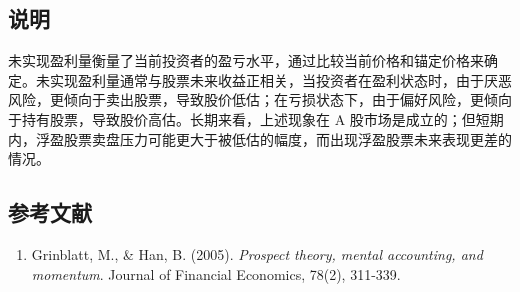 \documentclass{article}
\begin{document}
\subsection{说明}
未实现盈利量衡量了当前投资者的盈亏水平，通过比较当前价格和锚定价格来确定。未实现盈利量通常与股票未来收益正相关，当投资者在盈利状态时，由于厌恶风险，更倾向于卖出股票，导致股价低估；在亏损状态下，由于偏好风险，更倾向于持有股票，导致股价高估。长期来看，上述现象在 A 股市场是成立的；但短期内，浮盈股票卖盘压力可能更大于被低估的幅度，而出现浮盈股票未来表现更差的情况。

\subsection{参考文献}
\begin{enumerate}
    \item Grinblatt, M., \& Han, B. (2005). \textit{Prospect theory, mental accounting, and momentum}. Journal of Financial Economics, 78(2), 311-339.
\end{enumerate}
\end{document}
